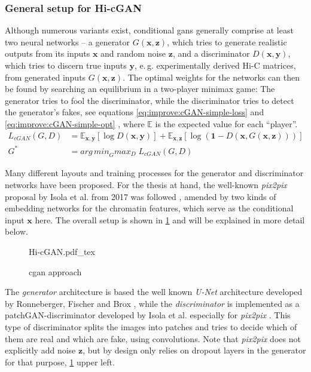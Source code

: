 \subsubsection{General setup for Hi-cGAN}
Although numerous variants exist, conditional \acrshort{gan}s generally comprise at least two neural networks -- 
a generator $G(\bm{x},\bm{z})$, which tries to generate realistic outputs from its inputs $\bm{x}$ and random noise $\bm{z}$, 
and a discriminator $D(\bm{x},\bm{y})$, which tries to discern true inputs $\bm{y}$, e.\,g. experimentally derived Hi-C matrices, 
from generated inputs $G(\bm{x},\bm{z})$.
The optimal weights for the networks can then be found by searching an equilibrium in a two-player minimax game:
The generator tries to fool the discriminator, while the discriminator tries to detect the generator's fakes, 
see equations \ref{eq:improve:cGAN-simple-loss} and \ref{eq:improve:cGAN-simple-opt} \cite{Isola2017}, where $\mathbb{E}$ is the expected value for each ``player''.
\begin{align}
 L_\mathit{cGAN}(G, D) &= \mathbb{E}_{\bm{x},\bm{y}}[\log D(\bm{x},\bm{y})] + \mathbb{E}_{\bm{x},\bm{z}}[\log(\bm{1}-D(\bm{x}, G(\bm{x},\bm{z})))] \label{eq:improve:cGAN-simple-loss} \\
 G^* &=  \mathit{arg\,min}_G \mathit{max}_D \; L_\mathit{cGAN}(G, D) \label{eq:improve:cGAN-simple-opt}
\end{align}

Many different layouts and training processes for the generator and discriminator networks have been proposed.
For the thesis at hand, the well-known \emph{pix2pix} proposal by Isola et al. from 2017 was followed \cite{Isola2017}, 
amended by two kinds of embedding networks for the chromatin features, which serve as the conditional input $\bm{x}$ here.
The overall setup is shown in \cref{fig:improve:cGAN-approach} and will be explained in more detail below.
\begin{figure}[htbp]
 {Hi-cGAN.pdf_tex}
 \caption{\acrshort{cgan} approach} \label{fig:improve:cGAN-approach}
\end{figure}

The \emph{generator} architecture is based the well known \emph{U-Net} architecture developed by Ronneberger, Fischer and Brox \cite{Ronneberger2015},
while the \emph{discriminator} is implemented as a patchGAN-discriminator developed by Isola et al. especially for \emph{pix2pix} \cite{Isola2017}.
This type of discriminator splits the images into patches and tries to decide which of them are real and which are fake, using convolutions.
Note that \emph{pix2pix} does not explicitly add noise $\bm{z}$, 
but by design only relies on dropout layers in the generator for that purpose, \cref{fig:improve:cGAN-approach} upper left. 

